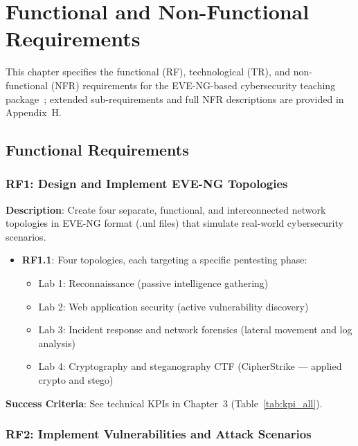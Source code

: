 
\chapter{Functional and Non-Functional Requirements}
\label{ch:requirements}

This chapter specifies the functional (RF), technological (TR), and non-functional (NFR) requirements for the EVE-NG-based cybersecurity teaching package~\cite{eve_ng}; extended sub-requirements and full NFR descriptions are provided in Appendix~H.

\section{Functional Requirements}

\subsection{RF1: Design and Implement EVE-NG Topologies}

\textbf{Description}: Create four separate, functional, and interconnected network topologies
in EVE-NG format (.unl files) that simulate real-world cybersecurity scenarios.

\begin{itemize}
\item \textbf{RF1.1}: Four topologies, each targeting a specific pentesting phase:
  \begin{itemize}
  \item Lab 1: Reconnaissance (passive intelligence gathering)
  \item Lab 2: Web application security (active vulnerability discovery)
  \item Lab 3: Incident response and network forensics (lateral movement and log analysis)
  \item Lab 4: Cryptography and steganography CTF (CipherStrike --- applied crypto and stego)
  \end{itemize}
\end{itemize}

\textbf{Success Criteria}: See technical KPIs in Chapter~3 (Table~\ref{tab:kpi_all}).

\subsection{RF2: Implement Vulnerabilities and Attack Scenarios}

